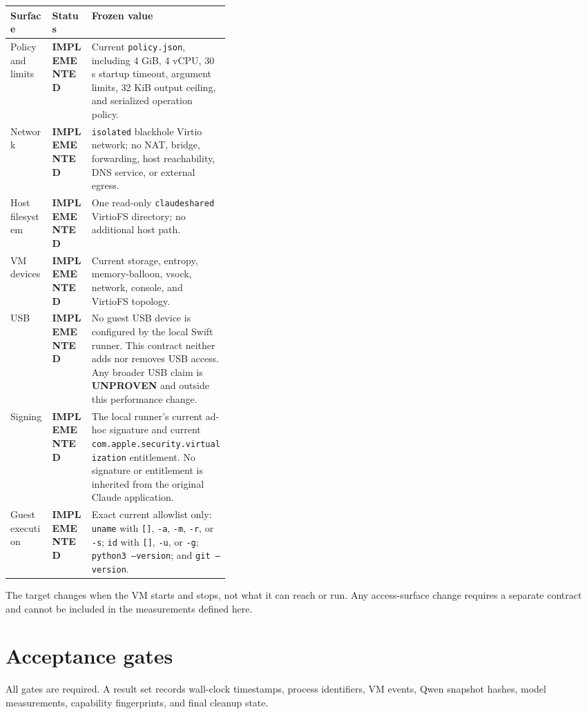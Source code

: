 \documentclass[10pt]{article}
\newcommand{\Implemented}{\textcolor{implemented}{\textbf{IMPLEMENTED}}}
\newcommand{\Unproven}{\textcolor{unproven}{\textbf{UNPROVEN}}}
\newcommand{\code}[1]{\texttt{#1}}
\begin{document}
\begin{center}
\small
\begin{tabularx}{\linewidth}{@{}>{\raggedright\arraybackslash}p{0.19\linewidth}
                                  >{\raggedright\arraybackslash}p{0.18\linewidth} X@{}}
\toprule
Surface & Status & Frozen value \\
\midrule
Policy and limits & \Implemented & Current \code{policy.json}, including 4 GiB, 4 vCPU, 30 s startup timeout, argument limits, 32 KiB output ceiling, and serialized operation policy. \\
Network & \Implemented & \code{isolated} blackhole Virtio network; no NAT, bridge, forwarding, host reachability, DNS service, or external egress. \\
Host filesystem & \Implemented & One read-only \code{claudeshared} VirtioFS directory; no additional host path. \\
VM devices & \Implemented & Current storage, entropy, memory-balloon, vsock, network, console, and VirtioFS topology. \\
USB & \Implemented & No guest USB device is configured by the local Swift runner.  This contract neither adds nor removes USB access.  Any broader USB claim is \Unproven{} and outside this performance change. \\
Signing & \Implemented & The local runner's current ad-hoc signature and current \code{com.apple.security.virtualization} entitlement.  No signature or entitlement is inherited from the original Claude application. \\
Guest execution & \Implemented & Exact current allowlist only: \code{uname} with \code{[]}, \code{-a}, \code{-m}, \code{-r}, or \code{-s}; \code{id} with \code{[]}, \code{-u}, or \code{-g}; \code{python3 --version}; and \code{git --version}. \\
\bottomrule
\end{tabularx}
\end{center}

The target changes when the VM starts and stops, not what it can reach or run.
Any access-surface change requires a separate contract and cannot be included in
the measurements defined here.

\section{Acceptance gates}\label{sec:gates}

All gates are required.  A result set records wall-clock timestamps, process
identifiers, VM events, Qwen snapshot hashes, model measurements, capability
fingerprints, and final cleanup state.
\end{document}
